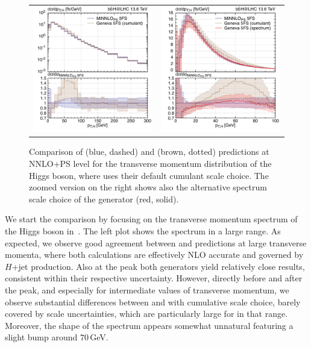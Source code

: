 \documentclass[11pt,a4paper]{article}
\begin{document}
\begin{figure}[t!]
\begin{center}
\begin{tabular}{cc}
\includegraphics[width=.45\textwidth, page=1]{plots/5fs/genevaminnlo/minnloKQvar-geneva-ptH.pdf}&
\includegraphics[width=.45\textwidth, page=1]{plots/5fs/genevaminnlo/minnloKQvar-genevaspec-ptHzoom.pdf}
\end{tabular}
\vspace*{1ex}
\caption{Comparison of \minnlo{} (blue, dashed) and \GENEVA{} (brown, dotted) predictions at NNLO+PS level for the transverse momentum distribution of the Higgs boson, where \GENEVA{} uses their default cumulant scale choice. The zoomed version on the right shows also the alternative spectrum scale choice of the \GENEVA{} generator (red, solid).\label{fig:genevaptH}}
\end{center}
\end{figure}

We start the comparison by focusing on the transverse momentum spectrum of the Higgs boson in~. The left plot shows the spectrum in a large range. As 
expected, we observe good agreement between \minnlo{} and \GENEVA{} predictions
at large transverse momenta, where both calculations are effectively NLO accurate and 
governed by $H$+jet production. Also at the peak both generators yield relatively 
close results, consistent within their respective uncertainty. However, directly
before and after the peak, and especially for intermediate values of 
transverse momentum, we observe substantial differences between \minnlo{} and \GENEVA{} with cumulative scale choice, barely covered by scale uncertainties,
which are particularly large for \GENEVA{} in that range. Moreover, the shape
of the \GENEVA{} spectrum appears somewhat unnatural featuring a slight bump
around $70$\,GeV.
\end{document}
